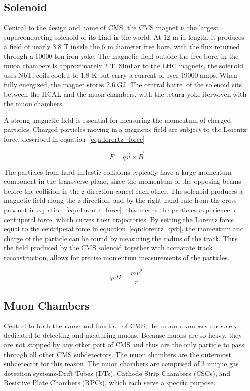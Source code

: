 \subsection{Solenoid}
Central to the design and name of CMS, the CMS magnet is the largest superconducting solenoid of its kind in the world.
At 12 m in length, it produces a field of nearly 3.8 T inside the 6 m diameter free bore, with the flux returned through a 10000 ton iron yoke.
The magnetic field outside the free bore, in the muon chambers is approximately 2 T.  
Similar to the LHC magnets, the solenoid uses NbTi coils cooled to 1.8 K but carry a current of over 19000 amps. When fully energized, the magnet
stores 2.6 GJ. The central barrel of the solenoid sits between the HCAL and the muon chambers, with the return yoke iterwoven with the muon chambers.

A strong magnetic field is essential for measuring the momentum of charged particles. Charged particles moving in a magnetic field are subject to the Lorentz force, described in
equation~\ref{eqn:lorentz_force} 

\begin{equation}
\label{eqn:lorentz_force}
 \vec{F} = q\vec{v} \times \vec{B}
\end{equation}

The particles from hard inelastic collisions typically have a large momentum component in the transverse plane, since the momentum of the opposing beams before the collision in the z-direction cancel each other.
The solenoid produces a magnetic field along the z-direction, and by the right-hand-rule from the cross product in equation~\ref{eqn:lorentz_force}, this means the particles experience a centripetal force, which
curves their trajectories. By setting the Lorentz force equal to the centripetal force in equation~\ref{eqn:lorentz_qvb}, the momentum and charge of the particle can be found by measuring the radius of the track. 
Thus the field produced by the CMS solenoid together with accuarate track reconstruction, allows for precise momentum measurements of the particles.

\begin{equation}
\label{eqn:lorentz_qvb}
 qvB = \frac{mv^{2}}{r}
\end{equation}

\subsection{Muon Chambers}
Central to both the name and function of CMS, the muon chambers are solely dedicated to detecting and measuring muons.
Because muons are so heavy, they are not stopped by any other part of CMS and thus are the only particle to pass through all other CMS subdetectors. The muon chambers are the outermost subdetector for this reason. 
The muon chambers are comprised of 3 unique gas detection systems-Drift Tubes (DTs), Cathode Strip Chambers (CSCs), and Resistive Plate Chambers (RPCs), which each serve a specific purpose. 

